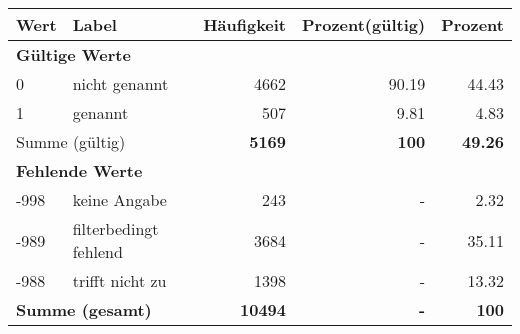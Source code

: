      \begin{longtable}{lXrrr}
     \toprule
     \textbf{Wert} & \textbf{Label} & \textbf{Häufigkeit} & \textbf{Prozent(gültig)} & \textbf{Prozent} \\
     \endhead
     \midrule
     \multicolumn{5}{l}{\textbf{Gültige Werte}}\\

     0 &
     \multicolumn{1}{X}{ nicht genannt   } &


       \num{4662} &
       \num[round-mode=places,round-precision=2]{90.19} &
         \num[round-mode=places,round-precision=2]{44.43} \\

     1 &
     \multicolumn{1}{X}{ genannt   } &


       \num{507} &
       \num[round-mode=places,round-precision=2]{9.81} &
         \num[round-mode=places,round-precision=2]{4.83} \\
     \midrule
     \multicolumn{2}{l}{Summe (gültig)} &
       \textbf{\num{5169}} &
     \textbf{\num{100}} &
       \textbf{\num[round-mode=places,round-precision=2]{49.26}} \\
     \multicolumn{5}{l}{\textbf{Fehlende Werte}}\\
       -998 &
       keine Angabe &
         \num{243} &
        - &
         \num[round-mode=places,round-precision=2]{2.32} \\
       -989 &
       filterbedingt fehlend &
         \num{3684} &
        - &
         \num[round-mode=places,round-precision=2]{35.11} \\
       -988 &
       trifft nicht zu &
         \num{1398} &
        - &
         \num[round-mode=places,round-precision=2]{13.32} \\
     \midrule
     \multicolumn{2}{l}{\textbf{Summe (gesamt)}} &
          \textbf{\num{10494}} &
        \textbf{-} &
        \textbf{\num{100}} \\
     \bottomrule
     \end{longtable}
     
